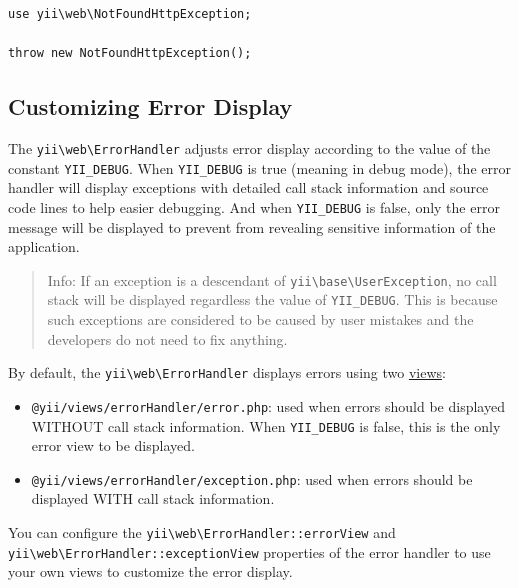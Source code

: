 \lstset{language=php}\begin{lstlisting}
use yii\web\NotFoundHttpException;

throw new NotFoundHttpException();
\end{lstlisting}
\subsection{Customizing Error Display \label{runtime-handling-errors.md::customizing-error-display}}
The \texttt{yii{\allowbreak{}\textbackslash}web{\allowbreak{}\textbackslash}ErrorHandler} adjusts error display according to the value of the constant \lstinline|YII_DEBUG|.
When \lstinline|YII_DEBUG| is true (meaning in debug mode), the error handler will display exceptions with detailed call
stack information and source code lines to help easier debugging. And when \lstinline|YII_DEBUG| is false, only the error
message will be displayed to prevent from revealing sensitive information of the application.

\begin{quote}Info: If an exception is a descendant of \texttt{yii{\allowbreak{}\textbackslash}base{\allowbreak{}\textbackslash}UserException}, no call stack will be displayed regardless
the value of \lstinline|YII_DEBUG|. This is because such exceptions are considered to be caused by user mistakes and the
developers do not need to fix anything.

\end{quote}
By default, the \texttt{yii{\allowbreak{}\textbackslash}web{\allowbreak{}\textbackslash}ErrorHandler} displays errors using two \hyperref[structure-views.md]{views}:

\begin{itemize}
\item \lstinline|@yii/views/errorHandler/error.php|: used when errors should be displayed WITHOUT call stack information.
When \lstinline|YII_DEBUG| is false, this is the only error view to be displayed.
\item \lstinline|@yii/views/errorHandler/exception.php|: used when errors should be displayed WITH call stack information.
\end{itemize}
You can configure the \texttt{yii{\allowbreak{}\textbackslash}web{\allowbreak{}\textbackslash}ErrorHandler\allowbreak{}::\allowbreak{}errorView} and \texttt{yii{\allowbreak{}\textbackslash}web{\allowbreak{}\textbackslash}ErrorHandler\allowbreak{}::\allowbreak{}exceptionView}
properties of the error handler to use your own views to customize the error display.

